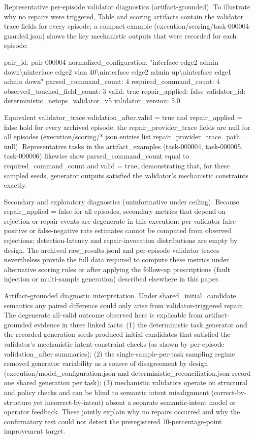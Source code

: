\documentclass[conference]{IEEEtran}
\begin{document}
Representative per-episode validator diagnostics (artifact-grounded). To illustrate why no repairs were triggered, Table and scoring artifacts contain the validator trace fields for every episode; a compact example (execution/scoring/task-000004-guarded.json) shows the key mechanistic outputs that were recorded for each episode:

pair\_id: pair-000004
  normalized\_configuration: "interface edge2 admin down\textbackslash{}ninterface edge2 vlan 40\textbackslash{}ninterface edge2 admin up\textbackslash{}ninterface edge1 admin down"
  parsed\_command\_count: 4
  required\_command\_count: 4
  observed\_touched\_field\_count: 3
  valid: true
  repair\_applied: false
  validator\_id: deterministic\_netops\_validator\_v5
  validator\_version: 5.0

Equivalent validator\_trace.validation\_after.valid = true and repair\_applied = false hold for every archived episode; the repair\_provider\_trace fields are null for all episodes (execution/scoring/*.json entries list repair\_provider\_trace\_path = null). Representative tasks in the artifact\_examples (task-000004, task-000005, task-000006) likewise show parsed\_command\_count equal to required\_command\_count and valid = true, demonstrating that, for these sampled seeds, generator outputs satisfied the validator's mechanistic constraints exactly.

Secondary and exploratory diagnostics (uninformative under ceiling). Because repair\_applied = false for all episodes, secondary metrics that depend on rejection or repair events are degenerate in this execution: per-validator false-positive or false-negative rate estimates cannot be computed from observed rejections; detection-latency and repair-invocation distributions are empty by design. The archived raw\_results.jsonl and per-episode validator traces nevertheless provide the full data required to compute these metrics under alternative scoring rules or after applying the follow-up prescriptions (fault injection or multi-sample generation) described elsewhere in this paper.

Artifact-grounded diagnostic interpretation. Under shared\_initial\_candidate semantics any paired difference could only arise from validator-triggered repair. The degenerate all-valid outcome observed here is explicable from artifact-grounded evidence in three linked facts: (1) the deterministic task generator and the recorded generation seeds produced initial candidates that satisfied the validator's mechanistic intent-constraint checks (as shown by per-episode validation\_after summaries); (2) the single-sample-per-task sampling regime removed generator variability as a source of disagreement by design (execution/model\_configuration.json and deterministic\_reconciliation.json record one shared generation per task); (3) mechanistic validators operate on structural and policy checks and can be blind to semantic intent misalignment (correct-by-structure yet incorrect-by-intent) absent a separate semantic-intent model or operator feedback. These jointly explain why no repairs occurred and why the confirmatory test could not detect the preregistered 10-percentage-point improvement target.
\end{document}
